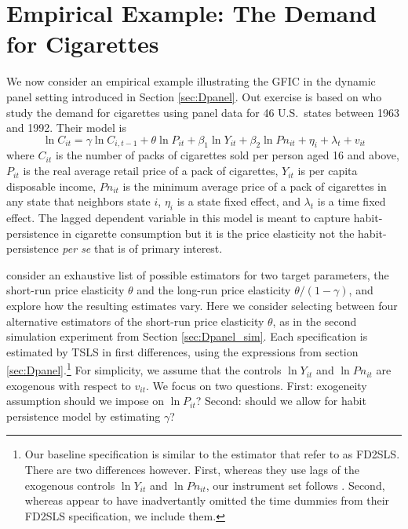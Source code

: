 \section{Empirical Example: The Demand for Cigarettes}
\label{sec:cigarettes}
We now consider an empirical example illustrating the GFIC in the dynamic panel setting introduced in Section \ref{sec:Dpanel}.
Out exercise is based on \cite{BaltagiEtAl2000} who study the demand for cigarettes using panel data for 46 U.S.\ states between 1963 and 1992. 
Their model is
\[
  \ln C_{it} =  \gamma \ln C_{i,t-1} + \theta \ln P_{it} + \beta_1 \ln Y_{it} + \beta_2 \ln Pn_{it} + \eta_i + \lambda_t + v_{it}
\] 
where $C_{it}$ is the number of packs of cigarettes sold per person aged 16 and above, $P_{it}$ is the real average retail price of a pack of cigarettes, $Y_{it}$ is per capita disposable income, $Pn_{it}$ is the minimum average price of a pack of cigarettes in any state that neighbors state $i$, $\eta_i$ is a state fixed effect, and $\lambda_t$ is a time fixed effect.
The lagged dependent variable in this model is meant to capture habit-persistence in cigarette consumption but it is the price elasticity not the habit-persistence \emph{per se} that is of primary interest. 

\cite{BaltagiEtAl2000} consider an exhaustive list of possible estimators for two target parameters, the short-run price elasticity $\theta$ and the long-run price elasticity $\theta/(1 - \gamma)$, and explore how the resulting estimates vary.
Here we consider selecting between four alternative estimators of the short-run price elasticity $\theta$, as in the second simulation experiment from Section \ref{sec:Dpanel_sim}.
Each specification is estimated by TSLS in first differences, using the expressions from section \ref{sec:Dpanel}.\footnote{Our baseline specification is similar to the estimator that \cite{BaltagiEtAl2000} refer to as FD2SLS. There are two differences however. First, whereas they use lags of the exogenous controls $\ln Y_{it}$ and $\ln Pn_{it}$, our instrument set follows \cite{AndersonHsiao}. 
Second, whereas \cite{BaltagiEtAl2000} appear to have inadvertantly omitted the time dummies from their FD2SLS specification, we include them.}
For simplicity, we assume that the controls $\ln Y_{it}$ and $\ln Pn_{it}$ are exogenous with respect to $v_{it}$.
We focus on two questions.
First: exogeneity assumption should we impose on $\ln P_{it}$?
Second: should we allow for habit persistence model by estimating $\gamma$?

